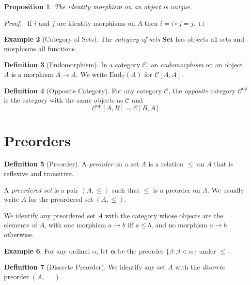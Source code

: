 \documentclass{book}
\let\qed\relax
\newtheorem{prop}{Proposition}[chapter]
\theoremstyle{definition}
\newtheorem{df}[prop]{Definition}
\newtheorem{ex}[prop]{Example}
\newcommand{\Set}{\ensuremath{\mathbf{Set}}}
\begin{document}
\begin{prop}
\label{prop:id-morph-unique}
    The identity morphism on an object is unique.
\end{prop}

\begin{proof}
    \pf\ If $i$ and $j$ are identity morphisms on $A$ then $i = i \circ j = j$. \qed
\end{proof}

\begin{ex}[Category of Sets]
    The \emph{category of sets} $\Set$ has objects all sets and morphisms all functions.
\end{ex}

\begin{df}[Endomorphism]
    In a category $\mathcal{C}$, an \emph{endomorphism} on an object $A$ is a morphism $A \rightarrow A$. We write $\mathrm{End}_\mathcal{C}(A)$ for $\mathcal{C}[A,A]$.
\end{df}

\begin{df}[Opposite Category]
    For any category $\mathcal{C}$, the \emph{opposite} category $\mathcal{C}^\mathrm{op}$ is the category with the same objects as $\mathcal{C}$ and
    \[ \mathcal{C}^\mathrm{op}[A,B] = \mathcal{C}[B,A] \]
\end{df}

\section{Preorders}

\begin{df}[Preorder]
    A \emph{preorder} on a set $A$ is a relation $\leq$ on $A$ that is reflexive and transitive.

    A \emph{preordered set} is a pair $(A, \leq)$ such that $\leq$ is a preorder on $A$. We usually write $A$ for the preordered set $(A, \leq)$.

    We identify any preordered set $A$ with the category whose objects are the elements of $A$, with one morphism $a \rightarrow b$ iff $a \leq b$, and no morphism $a \rightarrow b$ otherwise.
\end{df}

\begin{ex}
    For any ordinal $\alpha$, let $\mathbf{\alpha}$ be the preorder $\{ \beta : \beta < \alpha \}$ under $\leq$.
\end{ex}

\begin{df}[Discrete Preorder]
    We identify any set $A$ with the \emph{discrete} preorder $(A, =)$.
\end{df}
\end{document}
